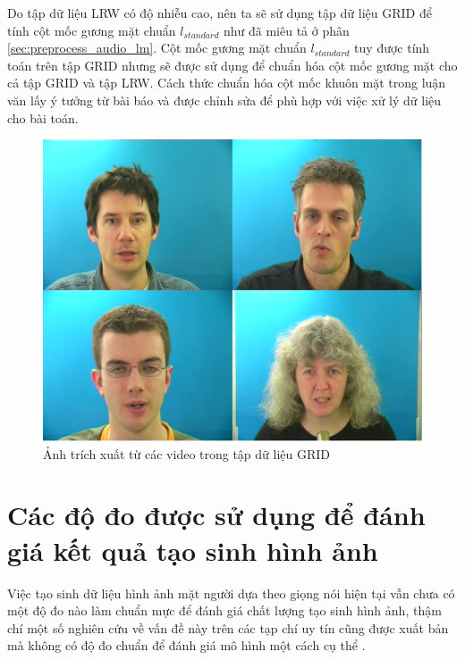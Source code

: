 Do tập dữ liệu LRW có độ nhiễu cao, nên ta sẽ sử dụng tập dữ liệu GRID để tính cột mốc gương mặt chuẩn $l_{standard}$ như đã miêu tả ở phân \ref{sec:preprocess_audio_lm}. Cột mốc gương mặt chuẩn $l_{standard}$ tuy được tính toán trên tập GRID nhưng sẽ được sử dụng để chuẩn hóa cột mốc gương mặt cho cả tập GRID và tập LRW. Cách thức chuẩn hóa cột mốc khuôn mặt trong luận văn lấy ý tưởng từ bài báo \cite{gen_face_landmark} và được chỉnh sửa để phù hợp với việc xử lý dữ liệu cho bài toán.

\begin{figure}[H]
    \centering
    \includegraphics[width=12cm]{./content/materials/grid.png}
    \caption{Ảnh trích xuất từ các video trong tập dữ liệu GRID}
\end{figure}

\section{Các độ đo được sử dụng để đánh giá kết quả tạo sinh hình ảnh}\label{sec:metrics}

Việc tạo sinh dữ liệu hình ảnh mặt người dựa theo giọng nói hiện tại vẫn chưa có một độ đo nào làm chuẩn mực để đánh giá chất lượng tạo sinh hình ảnh, thậm chí một số nghiên cứu về vấn đề này trên các tạp chí uy tín cũng được xuất bản mà không có độ đo chuẩn để đánh giá mô hình một cách cụ thể \cite{chung} \cite{wav2pix}.

